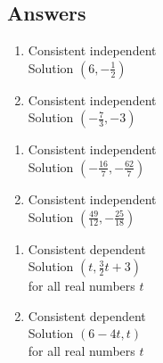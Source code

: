 \newpage

\subsection{Answers}

\begin{multicols}{2}
\begin{enumerate}

\item Consistent independent \\
Solution $\left(6, -\frac{1}{2}\right)$

\item Consistent independent \\
Solution $\left(-\frac{7}{3}, -3\right)$ 


\setcounter{HW}{\value{enumi}}
\end{enumerate}
\end{multicols}

\begin{multicols}{2}
\begin{enumerate}
\setcounter{enumi}{\value{HW}}

\item  Consistent independent \\
Solution $\left(-\frac{16}{7}, -\frac{62}{7}\right)$  

\item Consistent independent \\
Solution $\left(\frac{49}{12}, -\frac{25}{18}\right)$

\setcounter{HW}{\value{enumi}}
\end{enumerate}
\end{multicols}

\begin{multicols}{2}
\begin{enumerate}
\setcounter{enumi}{\value{HW}}

\item  Consistent dependent\\
Solution $\left(t, \frac{3}{2}t+3\right)$ \\
for all real numbers $t$

\item  Consistent dependent\\
Solution $\left(6-4t, t\right)$ \\
for all real numbers $t$

\setcounter{HW}{\value{enumi}}
\end{enumerate}
\end{multicols}



